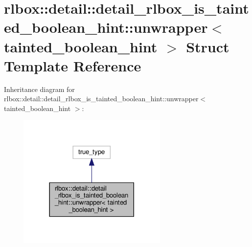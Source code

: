\hypertarget{structrlbox_1_1detail_1_1detail__rlbox__is__tainted__boolean__hint_1_1unwrapper_3_01tainted__boolean__hint_01_4}{}\section{rlbox\+:\+:detail\+:\+:detail\+\_\+rlbox\+\_\+is\+\_\+tainted\+\_\+boolean\+\_\+hint\+:\+:unwrapper$<$ tainted\+\_\+boolean\+\_\+hint $>$ Struct Template Reference}
\label{structrlbox_1_1detail_1_1detail__rlbox__is__tainted__boolean__hint_1_1unwrapper_3_01tainted__boolean__hint_01_4}


Inheritance diagram for rlbox\+:\+:detail\+:\+:detail\+\_\+rlbox\+\_\+is\+\_\+tainted\+\_\+boolean\+\_\+hint\+:\+:unwrapper$<$ tainted\+\_\+boolean\+\_\+hint $>$\+:\nopagebreak
\begin{figure}[H]
\begin{center}
\leavevmode
\includegraphics[width=209pt]{structrlbox_1_1detail_1_1detail__rlbox__is__tainted__boolean__hint_1_1unwrapper_3_01tainted__boolean__hint_01_4__inherit__graph}
\end{center}
\end{figure}


